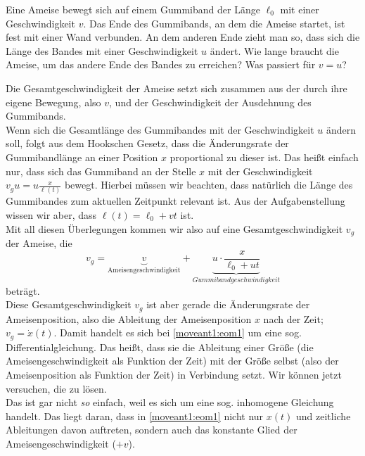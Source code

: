\begin{Exercise}[label = moveant, origin = {Jaan Kalda,\url{http://www.ioc.ee/~kalda/ipho/}}, difficulty = 3, title = Ameise auf dem Laufband]
	Eine Ameise bewegt sich auf einem Gummiband der Länge $\ell_0$ mit einer Geschwindigkeit $v$. Das Ende des Gummibands, an dem die Ameise startet, ist fest mit einer Wand verbunden. An dem anderen Ende zieht man so, dass sich die Länge des Bandes mit einer Geschwindigkeit $u$ ändert. Wie lange braucht die Ameise, um das andere Ende des Bandes zu erreichen? Was passiert für $v=u$?
\end{Exercise}
\begin{Answer}[ref = moveant]
	Die Gesamtgeschwindigkeit der Ameise setzt sich zusammen aus der durch ihre eigene Bewegung, also $v$, und der Geschwindigkeit der Ausdehnung des Gummibands.\\
	Wenn sich die Gesamtlänge des Gummibandes mit der Geschwindigkeit $u$ ändern soll, folgt aus dem Hookschen Gesetz, dass die Änderungsrate der Gummibandlänge an einer Position $x$ proportional zu dieser ist. Das heißt einfach nur, dass sich das Gummiband an der Stelle $x$ mit der Geschwindigkeit $v_gu = u \frac{x}{\ell\left(t\right)}$ bewegt. Hierbei müssen wir beachten, dass natürlich die Länge des Gummibandes zum aktuellen Zeitpunkt relevant ist. Aus der Aufgabenstellung wissen wir aber, dass $\ell\left(t\right) = \ell_0 + v t $ ist. \\
	Mit all diesen Überlegungen kommen wir also auf eine Gesamtgeschwindigkeit $v_g$ der Ameise, die 
	\begin{equation}\label{moveant1:eom1}
	v_g = 	\underbrace{v}_{\mathrm{Ameisengeschwindigkeit}} +\underbrace{u\cdot \frac{x}{\ell_0 + u t}}_{Gummibandgeschwindigkeit}
	\end{equation}
	beträgt.\\
	Diese Gesamtgeschwindigkeit $v_g$ ist aber gerade die Änderungsrate der Ameisenposition, also die Ableitung der Ameisenposition $x$ nach der Zeit; $v_g = \dot{x}\left(t\right)$. Damit handelt es sich bei \eqref{moveant1:eom1} um eine sog. Differentialgleichung. Das heißt, dass sie die Ableitung einer Größe (die Ameisengeschwindigkeit als Funktion der Zeit) mit der Größe selbst (also der Ameisenposition als Funktion der Zeit) in Verbindung setzt. Wir können jetzt versuchen, die zu lösen.\\
	Das ist gar nicht \textit{so} einfach, weil es sich um eine sog. inhomogene Gleichung handelt. Das liegt daran, dass in \eqref{moveant1:eom1} nicht nur $x\left(t\right)$ und zeitliche Ableitungen davon auftreten, sondern auch das konstante Glied der Ameisengeschwindigkeit ($+v$).\\

\end{Answer}

